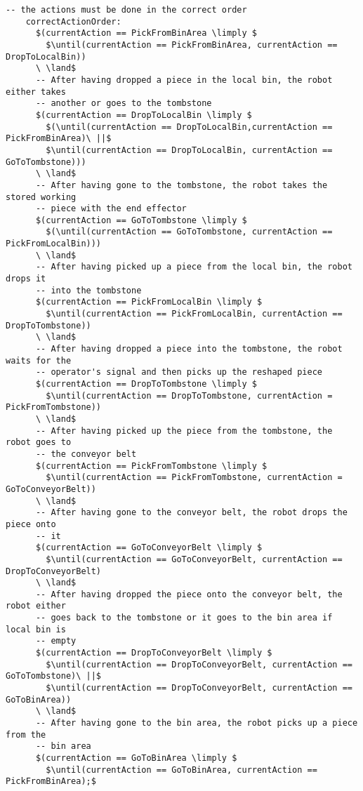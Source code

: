 \begin{lstlisting}[fontadjust, mathescape, frame=single]
    -- the actions must be done in the correct order
    correctActionOrder:
      $(currentAction == PickFromBinArea \limply $
        $\until(currentAction == PickFromBinArea, currentAction == DropToLocalBin))
      \ \land$
      -- After having dropped a piece in the local bin, the robot either takes 
      -- another or goes to the tombstone
      $(currentAction == DropToLocalBin \limply $
        $(\until(currentAction == DropToLocalBin,currentAction == PickFromBinArea)\ ||$
        $\until(currentAction == DropToLocalBin, currentAction == GoToTombstone)))
      \ \land$
      -- After having gone to the tombstone, the robot takes the stored working 
      -- piece with the end effector
      $(currentAction == GoToTombstone \limply $
        $(\until(currentAction == GoToTombstone, currentAction == PickFromLocalBin)))
      \ \land$
      -- After having picked up a piece from the local bin, the robot drops it 
      -- into the tombstone
      $(currentAction == PickFromLocalBin \limply $
        $\until(currentAction == PickFromLocalBin, currentAction == DropToTombstone))
      \ \land$
      -- After having dropped a piece into the tombstone, the robot waits for the 
      -- operator's signal and then picks up the reshaped piece
      $(currentAction == DropToTombstone \limply $ 
        $\until(currentAction == DropToTombstone, currentAction = PickFromTombstone))
      \ \land$
      -- After having picked up the piece from the tombstone, the robot goes to
      -- the conveyor belt
      $(currentAction == PickFromTombstone \limply $
        $\until(currentAction == PickFromTombstone, currentAction = GoToConveyorBelt))
      \ \land$
      -- After having gone to the conveyor belt, the robot drops the piece onto
      -- it
      $(currentAction == GoToConveyorBelt \limply $
        $\until(currentAction == GoToConveyorBelt, currentAction == DropToConveyorBelt)
      \ \land$
      -- After having dropped the piece onto the conveyor belt, the robot either 
      -- goes back to the tombstone or it goes to the bin area if local bin is 
      -- empty
      $(currentAction == DropToConveyorBelt \limply $
        $\until(currentAction == DropToConveyorBelt, currentAction == GoToTombstone)\ ||$
        $\until(currentAction == DropToConveyorBelt, currentAction == GoToBinArea))
      \ \land$
      -- After having gone to the bin area, the robot picks up a piece from the 
      -- bin area
      $(currentAction == GoToBinArea \limply $
        $\until(currentAction == GoToBinArea, currentAction == PickFromBinArea);$


\end{lstlisting}
